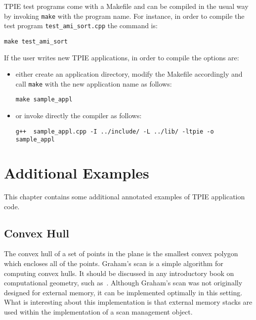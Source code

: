 TPIE test programs come with a Makefile and can be compiled in the usual
way by invoking \verb|make| with the program name. For instance, in order to
compile the test program \verb|test_ami_sort.cpp| the command is:

\begin{verbatim}
make test_ami_sort
\end{verbatim}


If the user writes new TPIE applications, in order to compile the options
are:
\begin{itemize}
\item either create an application directory, modify the Makefile
  accordingly and call \verb|make| with the new application name as
  follows:
\begin{verbatim}
make sample_appl
\end{verbatim}

  
\item or invoke directly the compiler as follows:

\begin{verbatim}
g++  sample_appl.cpp -I ../include/ -L ../lib/ -ltpie -o sample_appl
\end{verbatim}
\end{itemize}









\chapter{Additional Examples} \label{ch:examples}

This chapter contains some additional annotated examples of 
TPIE application code.

\section{Convex Hull}
\label{sec:convex-hull}

The convex hull of a set of points in the plane is the smallest convex
polygon which encloses all of the points.  Graham's scan is a simple
algorithm for computing convex hulls.  It should be discussed in any
introductory book on computational geometry, such as~\cite{preparata:cg}.  Although Graham's scan was not originally designed for
external memory, it can be implemented optimally in this setting.
What is interesting about this implementation is that external memory
stacks are used within the implementation of a scan management object.


